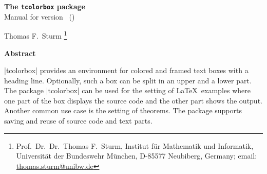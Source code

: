 \tcbuselistingtext
{}


\clearpage
\begin{center}
\begin{tcolorbox}[enhanced,hbox,tikznode,left=8mm,right=8mm,boxrule=0.4pt,
  colback=white,colframe=black!50!yellow,
  drop lifted shadow=black!50!yellow,
  before=\par\vspace*{5mm},after=\par\bigskip]
{\bfseries\LARGE The \texttt{tcolorbox} package}\\[3mm]
{\large Manual for version \version\ (\datum)}
\end{tcolorbox}
{\large Thomas F.~Sturm%
  \footnote{Prof.~Dr.~Dr.~Thomas F.~Sturm, Institut f\"{u}r Mathematik und Informatik,
    Universit\"{a}t der Bundeswehr M\"{u}nchen, D-85577 Neubiberg, Germany;
     email: \href{mailto:thomas.sturm@unibw.de}{thomas.sturm@unibw.de}} }
\end{center}
\bigskip
\begin{absquote}
  \begin{center}\bfseries Abstract\end{center}
  |tcolorbox| provides an environment for colored and framed text boxes with a
  heading line. Optionally, such a box can be split in an upper and a lower
  part. The package |tcolorbox| can be used for the setting of \LaTeX\ examples where
  one part of the box displays the source code and the other part shows the
  output. Another common use case is the setting of theorems. The package supports
  saving and reuse of source code and text parts.
\end{absquote}

